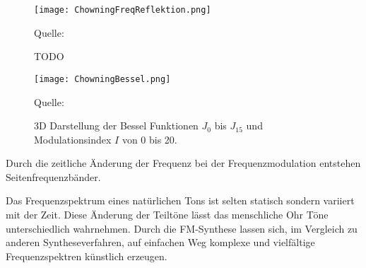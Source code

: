 \begin{figure} [ht]
\centering
  \texttt{[image: ChowningFreqReflektion.png]}
\caption{TODO}
\label{fig:chowningFreqReflektion}
Quelle: \cite{chowningPaper}
\end{figure}
\FloatBarrier





\begin{figure} [ht]
\centering
  \texttt{[image: ChowningBessel.png]}
\caption{3D Darstellung der Bessel Funktionen $J_0$ bis $J_{15}$ und Modulationsindex $I$ von 0 bis 20. }
\label{fig:bessel3D}
Quelle: \cite{chowningPaper}
\end{figure}



Durch die zeitliche Änderung der Frequenz bei der Frequenzmodulation entstehen Seitenfrequenzbänder.


Das Frequenzspektrum eines natürlichen Tons ist selten statisch sondern variiert mit der Zeit. Diese Änderung der Teiltöne lässt das menschliche Ohr Töne unterschiedlich wahrnehmen. Durch die FM-Synthese lassen sich, im Vergleich zu anderen Syntheseverfahren, auf einfachen Weg komplexe und vielfältige Frequenzspektren künstlich erzeugen.

\FloatBarrier
